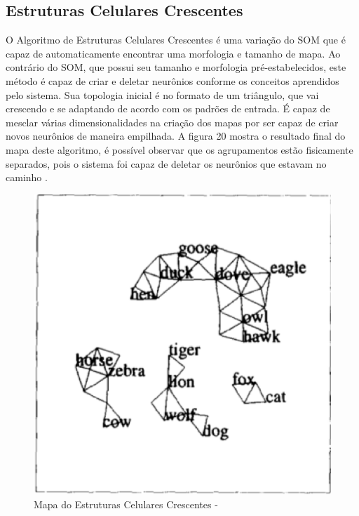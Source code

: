 \subsection{Estruturas Celulares Crescentes}
O Algoritmo de Estruturas Celulares Crescentes é uma variação do SOM que é capaz de automaticamente encontrar uma morfologia e tamanho de mapa. Ao contrário do SOM, que possui seu tamanho e morfologia pré-estabelecidos, este método é capaz de criar e deletar neurônios conforme os conceitos aprendidos pelo sistema. Sua topologia inicial é no formato de um triângulo, que vai crescendo e se adaptando de acordo com os padrões de entrada. É capaz de mesclar várias dimensionalidades na criação dos mapas por ser capaz de criar novos neurônios de maneira empilhada. A figura 20 mostra o resultado final do mapa deste algoritmo, é possível observar que os agrupamentos estão fisicamente separados, pois o sistema foi capaz de deletar os neurônios que estavam no caminho \cite{cellsom2000}.

\begin{figure}[!h]
\centering
\includegraphics[keepaspectratio=true,scale=0.50]
{figuras/cellsom.eps}
\caption{Mapa do Estruturas Celulares Crescentes - }
\label{data_titatic}
\end{figure}

